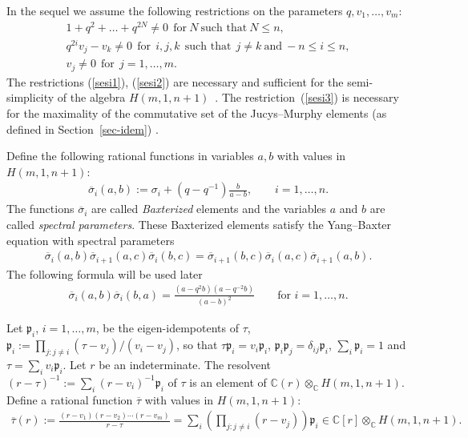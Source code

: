 \documentclass[11pt]{article}
\newcommand{\bsi}{{\overline{\sigma}}}
\newcommand{\bta}{{\overline{\tau}}}
\begin{document}
In the sequel we assume the following restrictions on the parameters $q,v_1,\dots,v_m$:
\begin{gather}\label{sesi1}
 1+q^2+\dots+q^{2N}\neq 0\ \ {\textrm{for}}\ N\ \text{such that}\ N\leq n
 , \\
\label{sesi2}
 q^{2i}v_j-v_k\neq 0\ \ {\textrm{for}}\ \ i,j,k \ \ {\textrm{such that}}\ \  j\neq k \ {\textrm{and}}\ -n\leq i \leq n
 , \\
\label{sesi3}
 v_j\neq 0\ \ \text{for}\ \ j=1,\dots,m  .
\end{gather}
The restrictions (\ref{sesi1}), (\ref{sesi2}) are necessary and suf\/f\/icient for the semi-simplicity of
the algebra $H(m,1,n+1)$~\cite[main theorem]{A}.
The restriction~(\ref{sesi3}) is necessary for the maximality of the commutative
set of the Jucys--Murphy elements (as def\/ined in Section~\ref{sec-idem}) \cite[Proposition~3.2]{A}.



Def\/ine the following rational functions in variables $a,b$ with values in $H(m,1,n+1)$:
\begin{gather}\label{bax-s}
\bsi_i(a,b):=\sigma_i+(q-q^{-1})\frac{b}{a-b}  ,\qquad i=1,\dots,n  .
\end{gather}
The functions $\bsi_i$ are called {\it Baxterized} elements and the variables $a$ and $b$ are called {\it spectral parameters}.
These Baxterized elements satisfy the Yang--Baxter equation with spectral para\-me\-ters
\begin{gather*}
\bsi_i(a,b)\bsi_{i+1}(a,c)\bsi_i(b,c)=\bsi_{i+1}(b,c)\bsi_i(a,c)\bsi_{i+1}(a,b) .
\end{gather*}
The following formula will be used later
\begin{gather}\label{baxt-inv1}
 \bsi_i(a,b)\bsi_i(b,a)=\frac{(a-q^2b)(a-q^{-2}b)}{(a-b)^2} \qquad\textrm{for \ \ $i=1,\dots,n$}.
\end{gather}

Let $\mathfrak{p}_i$, $i=1,\dots,m$,
be the eigen-idempotents of $\tau$, $\mathfrak{p}_i:=\prod\limits_{j:j\neq i} (\tau-v_j)/(v_i-v_j)$, so that $\tau\mathfrak{p}_i=v_i\mathfrak{p}_i$, $\mathfrak{p}_i\mathfrak{p}_j=\delta_{ij}\mathfrak{p}_i$, $\sum_i \mathfrak{p}_i=1$ and $\tau=\sum_i v_i\mathfrak{p}_i$.
Let $r$ be an indeterminate.
The resolvent $(r-\tau)^{-1}:=\sum_i(r-v_i)^{-1}\mathfrak{p}_i$ of $\tau$ is an element of
$\mathbb{C}(r)\otimes_{\mathbb{C}} H(m,1,n+1)$.
Def\/ine a rational function $\bta$ with values in $H(m,1,n+1)$:
\begin{gather}\label{bax-t2}
\bta(r):=\frac{(r-v_1)(r-v_2)\cdots(r-v_m)}{r-\tau}=\sum_i\left(\prod_{j:j\neq i} (r-v_j)\!\right)\!\mathfrak{p}_i\in\mathbb{C}[r]\otimes_{\mathbb{C}} H(m,1,n+1)  .\!\!\!
\end{gather}
\end{document}
